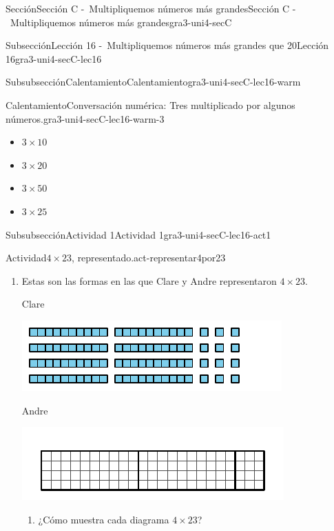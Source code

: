 \documentclass[twoside,10pt,]{article}
\begin{document}
\begin{sectionptx}{Sección}{Sección C -~Multipliquemos números más grandes}{}{Sección C -~Multipliquemos números más grandes}{}{}{gra3-uni4-secC}
\begin{subsectionptx}{Subsección}{Lección 16 -~Multipliquemos números más grandes que 20}{}{Lección 16}{}{}{gra3-uni4-secC-lec16}
\begin{subsubsectionptx}{Subsubsección}{Calentamiento}{}{Calentamiento}{}{}{gra3-uni4-secC-lec16-warm}
\begin{exploration}{Calentamiento}{Conversación numérica: Tres multiplicado por algunos números.}{gra3-uni4-secC-lec16-warm-3}
\begin{itemize}[label=\textbullet]
\item{}\(\displaystyle 3\times 10\)%
\item{}\(\displaystyle 3\times 20\)%
\item{}\(\displaystyle 3\times 50\)%
\item{}\(\displaystyle 3\times 25\)%
\end{itemize}
\end{exploration}%
\end{subsubsectionptx}
%
%
\typeout{************************************************}
\typeout{************************************************}
%
\begin{subsubsectionptx}{Subsubsección}{Actividad 1}{}{Actividad 1}{}{}{gra3-uni4-secC-lec16-act1}
\begin{activity}{Actividad}{\(4\times 23\), representado.}{act-representar4por23}%
%
\begin{enumerate}
\item{}Estas son las formas en las que Clare y Andre representaron \(4\times 23\).%
\begin{sidebyside}{2}{0}{0}{0}%
\begin{sbspanel}{0.5}%
Clare%
\par
\includegraphics[width=\linewidth]{external/svg-source/tikz-file-152969.pdf}
\end{sbspanel}%
\begin{sbspanel}{0.5}%
Andre%
\par
\includegraphics[width=\linewidth]{external/svg-source/tikz-file-152970.pdf}
\end{sbspanel}%
\end{sidebyside}%
%
\begin{enumerate}
\item{}¿Cómo muestra cada diagrama \(4\times 23\)?%

\end{enumerate}
\end{enumerate}
\end{activity}
\end{subsubsectionptx}
\end{subsectionptx}
\end{sectionptx}
\end{document}
